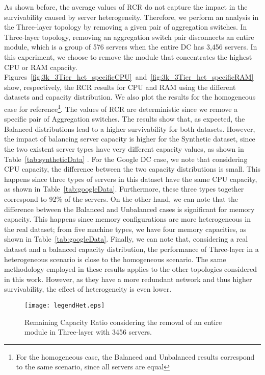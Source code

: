 As shown before, the average values of RCR do not capture the impact in the survivability caused by server heterogeneity.
Therefore, we perform an analysis in the Three-layer topology by removing a given pair of aggregation switches. In Three-layer topology, removing an aggregation switch pair disconnects an entire module, which is a group of 576 servers when the entire DC has 3,456 servers. In this experiment, we choose to remove the module that concentrates the highest CPU or RAM capacity. Figures~\ref{fig:3k_3Tier_het_specificCPU}~and~\ref{fig:3k_3Tier_het_specificRAM} show, respectively, the RCR results for CPU and RAM using the different datasets and capacity distribution. We also plot the results for the homogeneous case for reference\footnote{For the homogeneous case, the Balanced and Unbalanced results correspond to the same scenario, since all servers are equal}. The values of RCR are deterministic since we remove a specific pair of Aggregation switches. The results show that, as expected, the Balanced distributions lead to a higher survivability for both datasets. However, the impact of balancing server capacity is higher for the Synthetic dataset, since the two existent server types have very different capacity values, as shown in Table~\ref{tab:syntheticData} . For the Google DC case, we note that considering CPU capacity, the difference between the two capacity distributions is small. This happens since three types of servers in this dataset have the same CPU capacity, as shown in Table~\ref{tab:googleData}. Furthermore, these three types together correspond to 92\% of the servers. On the other hand, we can note that the difference between the Balanced and Unbalanced cases is significant for memory capacity. This happens since memory configurations are more heterogeneous in the real dataset; from five machine types, we have four memory capacities, as shown in Table~\ref{tab:googleData}. Finally, we can note that, considering a real dataset and a balanced capacity distribution, the performance of Three-layer in a heterogeneous scenario is close to the homogeneous scenario. The same methodology employed in these results applies to the other topologies considered in this work. However, as they have a more redundant network and thus higher survivability, the effect of heterogeneity is even lower.
\begin{figure}[h!]
\centering
{}
{\texttt{[image: legendHet.eps]}}
\caption{Remaining Capacity Ratio considering the removal of an entire module in Three-layer with 3456 servers.}
\label{fig:3k_3Tier_het_specific}
\end{figure}

